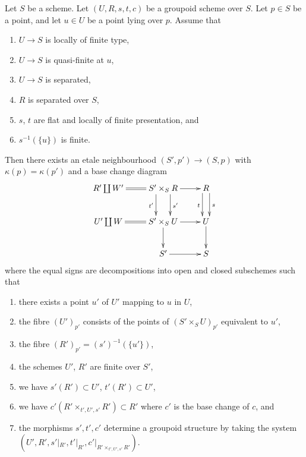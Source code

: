 \begin{lemma}
\label{lemma-quasi-finite-over-base}
Let $S$ be a scheme.
Let $(U, R, s, t, c)$ be a groupoid scheme over $S$.
Let $p \in S$ be a point, and let $u \in U$ be a point lying over $p$.
Assume that
\begin{enumerate}
\item $U \to S$ is locally of finite type,
\item $U \to S$ is quasi-finite at $u$,
\item $U \to S$ is separated,
\item $R$ is separated over $S$,
\item $s$, $t$ are flat and locally of finite presentation, and
\item $s^{-1}(\{u\})$ is finite.
\end{enumerate}
Then there exists an etale neighbourhood $(S', p') \to (S, p)$ with
$\kappa(p) = \kappa(p')$ and a base change diagram
$$
\xymatrix{
R' \coprod W'
\ar@{=}[r] &
S' \times_S R
\ar[r] \ar@<2ex>[d]^{s'} \ar@<-2ex>[d]_{t'} &
R \ar@<1ex>[d]^s \ar@<-1ex>[d]_t \\
U' \coprod W
\ar@{=}[r] &
S' \times_S U
\ar[r] \ar[d] &
U \ar[d] \\
 &
S' \ar[r] &
S
}
$$
where the equal signs are decompositions into open and closed
subschemes such that
\begin{enumerate}
\item there exists a point $u'$ of $U'$ mapping to $u$ in $U$,
\item the fibre $(U')_{p'}$ consists of the points of $(S' \times_S U)_{p'}$
equivalent to $u'$,
\item the fibre $(R')_{p'} = (s')^{-1}(\{u'\})$,
\item the schemes $U'$, $R'$ are finite over $S'$,
\item we have $s'(R') \subset U'$, $t'(R') \subset U'$,
\item we have
$c'(R' \times_{t', U', s'} R') \subset R'$
where $c'$ is the base change of $c$, and
\item the morphisms $s', t', c'$ determine a groupoid structure
by taking the system
$(U', R', s'|_{R'}, t'|_{R'}, c'|_{R' \times_{t', U', s'} R'})$.
\end{enumerate}
\end{lemma}

